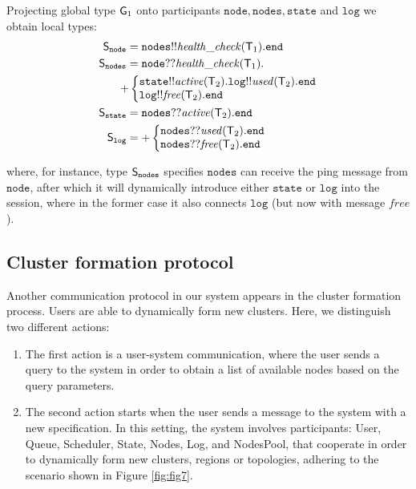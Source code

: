 Projecting global type ${\sf G}_1$ onto participants $\mathtt{node}, \mathtt{nodes}, \mathtt{state}$ and $\mathtt{log}$ we obtain local types:
\begin{align*}
\ST_\mathtt{node}  & = 
\mathtt{nodes}{!!}\mathit{health{\_}check}(\T_1).\tend \\
%
%
\ST_\mathtt{nodes} & = 
\mathtt{node}{??}\mathit{health{\_}check}(\T_1). \\
& \hspace{-2mm}
{+} 
\left\{
\begin{array}{@{}l@{}}
\mathtt{state}{!!}\mathit{active}(\T_2).\mathtt{log}{!!}\mathit{used}(\T_2).\tend\\
\mathtt{log}{!!}\mathit{free}(\T_2).\tend
\end{array} \right.\\
%
%
\ST_\mathtt{state} &= 
\mathtt{nodes}{??}\mathit{active}(\T_2).\tend\\
%
%
\ST_\mathtt{log} &= 
{+}
\left\{
\begin{array}{@{}l@{}}
\mathtt{nodes}{??}\mathit{used}(\T_2).\tend\\
\mathtt{nodes}{??}\mathit{free}(\T_2).\tend
\end{array} \right.
\end{align*}

where, for instance, type ${\mathsf S}_\mathtt{nodes}$ specifies $\mathtt{nodes}$ can receive the ping message from $\mathtt{node}$, after which it will dynamically introduce either $\mathtt{state}$ or $\mathtt{log}$ into the session, where in the former case it also connects $\mathtt{log}$ (but now with message $\mathit{free}$). 
%
%
\subsection{Cluster formation protocol}\label{sec:cluster_formation_protocol}
%
Another communication protocol in our system appears in the cluster formation process. Users are able to dynamically form new clusters. Here, we distinguish two different actions:

\begin{enumerate}[start=1,label={(\bfseries \arabic*)}]
	\item The first action is a user-system communication, where the user sends a query to the system in order to obtain a list of available nodes based on the query parameters.
	\item The second action starts when the user sends a message to the system with a new specification. In this setting, the  system involves participants: User, Queue, Scheduler, State, Nodes, Log, and NodesPool, that cooperate in order to dynamically form new clusters, regions or topologies, adhering to the scenario shown in Figure \ref{fig:fig7}.
\end{enumerate} 

